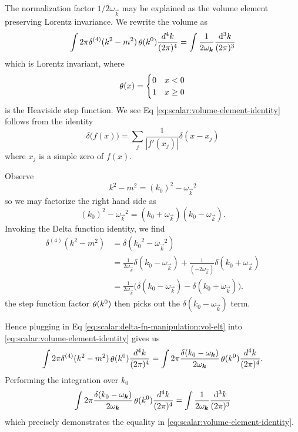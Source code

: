 The normalization factor $1/2\omega_{\vec{k}}$ may be explained as the
volume element preserving Lorentz invariance. We rewrite the volume as
\begin{equation}\label{eq:scalar:volume-element-identity}
\int2\pi\delta^{(4)}(k^{2}-m^{2})\stepFn(k^{0})\frac{d^{4}k}{(2\pi)^{4}}
=\int\frac{1}{2\omega_{\vec{k}}}\frac{\D^{3}k}{(2\pi)^{3}}
\end{equation}
which is Lorentz invariant, where
\begin{equation}
\mathop{\theta}\nolimits(x) = \begin{cases}0 & x<0\\
1 & x\geq0
\end{cases}
\end{equation}
is the Heaviside step function\index{$\stepFn(-)$}.
We see Eq \eqref{eq:scalar:volume-element-identity} follows from the
identity
\begin{equation}
\delta\bigl(f(x)\bigr) = \sum_{j}\frac{1}{|f'(x_{j})|}\delta(x-x_{j})
\end{equation}
where $x_{j}$ is a simple zero of $f(x)$.

Observe
\begin{equation}
k^{2}-m^{2}=(k_{0})^{2}-{\omega_{\vec{k}}}^{2}
\end{equation}
so we may factorize the right hand side as
\begin{equation}
(k_{0})^{2}-{\omega_{\vec{k}}}^{2}=(k_{0}+\omega_{\vec{k}})(k_{0}-\omega_{\vec{k}}).
\end{equation}
Invoking the Delta function identity, we find
\begin{subequations}
\begin{align}
\delta^{(4)}(k^{2}-m^{2})
&=\delta({k_{0}}^{2}-{\omega_{\vec{k}}}^{2})\\
&=\frac{1}{2\omega_{\vec{k}}}\delta(k_{0}-\omega_{\vec{k}})
+\frac{1}{(-2\omega_{\vec{k}})}\delta(k_{0}+\omega_{\vec{k}})\\
&=\frac{1}{2\omega_{\vec{k}}}\bigl(\delta(k_{0}-\omega_{\vec{k}})-\delta(k_{0}+\omega_{\vec{k}})\bigr).\label{eq:scalar:delta-fn-manipulation:vol-elt}
\end{align}
\end{subequations}
the step function factor $\mathop{\theta}\nolimits(k^{0})$ then picks out the
$\delta(k_{0}-\omega_{\vec{k}})$ term.

Hence plugging in Eq \eqref{eq:scalar:delta-fn-manipulation:vol-elt} into \eqref{eq:scalar:volume-element-identity}
gives us
\begin{equation}
\int2\pi\delta^{(4)}(k^{2}-m^{2})\stepFn(k^{0})\frac{d^{4}k}{(2\pi)^{4}}
=\int2\pi\frac{\delta(k_{0}-\omega_{\vec{k}})}{2\omega_{\vec{k}}}\stepFn(k^{0})\frac{d^{4}k}{(2\pi)^{4}}.
\end{equation}
Performing the integration over $k_{0}$
\begin{equation}
\int2\pi\frac{\delta(k_{0}-\omega_{\vec{k}})}{2\omega_{\vec{k}}}\stepFn(k^{0})\frac{d^{4}k}{(2\pi)^{4}}
=\int\frac{1}{2\omega_{\vec{k}}}\frac{\D^{3}k}{(2\pi)^{3}}
\end{equation}
which precisely demonstrates the equality in \eqref{eq:scalar:volume-element-identity}.

